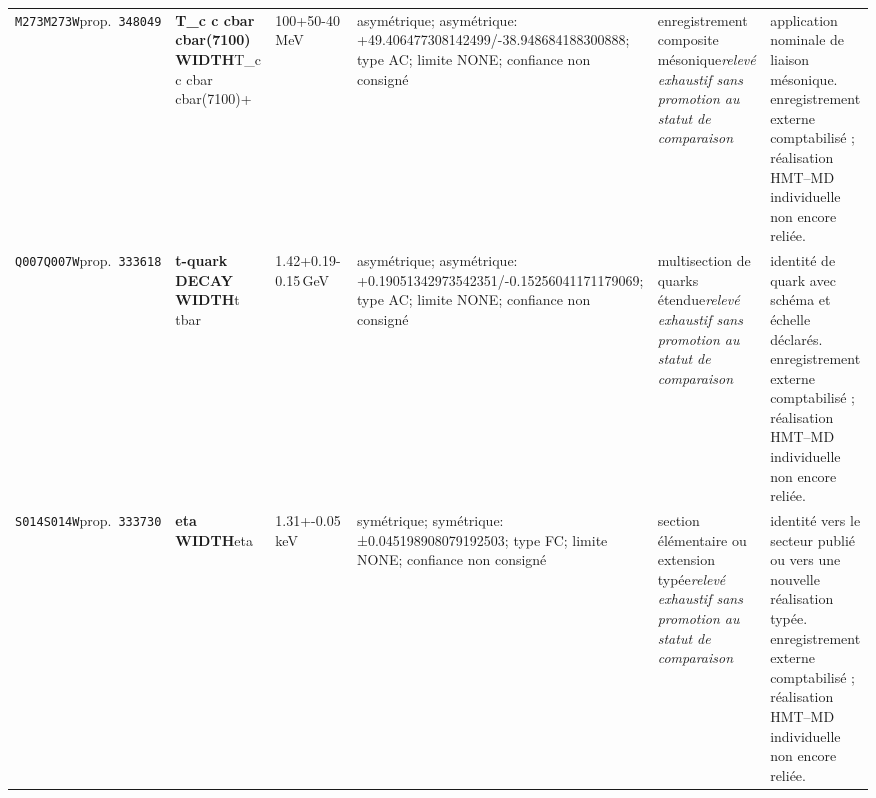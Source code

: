 \begin{landscape}
\begin{longtable}{L{1.85cm}L{4.45cm}L{2.35cm}L{4.05cm}L{3.35cm}L{7.15cm}}
\texttt{M273}\newline \texttt{M273W}\newline prop.\ \texttt{348049} & \textbf{T\_\allowbreak{}c c cbar cbar(7100) WIDTH}\newline T\_\allowbreak{}c c cbar cbar(7100)+ & 100+50-40\,MeV & asymétrique; asymétrique: +49.406477308142499/-38.948684188300888; type AC; limite NONE; confiance non consigné & enregistrement composite mésonique\newline \emph{relevé exhaustif sans promotion au statut de comparaison} & application nominale de liaison mésonique. enregistrement externe comptabilisé ; réalisation HMT--MD individuelle non encore reliée. \\
\texttt{Q007}\newline \texttt{Q007W}\newline prop.\ \texttt{333618} & \textbf{t-quark DECAY WIDTH}\newline t \textbar{}\allowbreak{} tbar & 1.42+0.19-0.15\,GeV & asymétrique; asymétrique: +0.19051342973542351/-0.15256041171179069; type AC; limite NONE; confiance non consigné & multisection de quarks étendue\newline \emph{relevé exhaustif sans promotion au statut de comparaison} & identité de quark avec schéma et échelle déclarés. enregistrement externe comptabilisé ; réalisation HMT--MD individuelle non encore reliée. \\
\texttt{S014}\newline \texttt{S014W}\newline prop.\ \texttt{333730} & \textbf{eta WIDTH}\newline eta & 1.31+-0.05\,keV & symétrique; symétrique: ±0.045198908079192503; type FC; limite NONE; confiance non consigné & section élémentaire ou extension typée\newline \emph{relevé exhaustif sans promotion au statut de comparaison} & identité vers le secteur publié ou vers une nouvelle réalisation typée. enregistrement externe comptabilisé ; réalisation HMT--MD individuelle non encore reliée. \\

\end{longtable}
\end{landscape}

